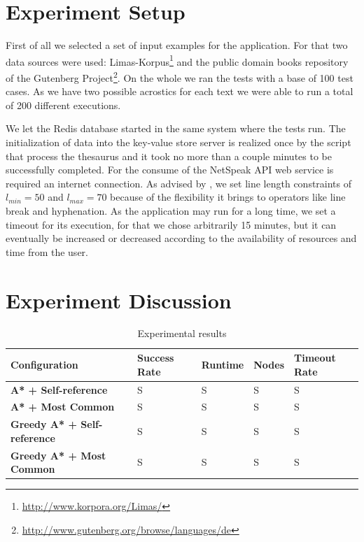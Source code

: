 \documentclass[11pt]{reportAlternative}
\begin{document}
\section{Experiment Setup}
First of all we selected a set of input examples for the application. For that two data sources were used: Limas-Korpus\footnote{\url{http://www.korpora.org/Limas/}} and the public domain books repository of the Gutenberg Project\footnote{\url{http://www.gutenberg.org/browse/languages/de}}. On the whole we ran the tests with a base of  100 test cases. As we have two possible acrostics for each text we were able to run a total of 200 different executions.

We let the Redis database started in the same system where the tests run. The initialization of data into the key-value store server is realized once by the script that process the thesaurus and it took no more than a couple minutes to be successfully completed. For the consume of the NetSpeak API web service is required an internet connection. As advised by \cite{Stein}, we set line length constraints of $l_{min} = 50$ and $l_{max} = 70$ because of the flexibility it brings to operators like line break and hyphenation. As the application may run for a long time, we set a timeout for its execution, for that we chose arbitrarily 15 minutes, but it can eventually be increased or decreased according to the availability of resources and time from the user.


\section{Experiment Discussion}

\begin{table}
\centering
\begin{tabular}{l | l | l | l | l}
	\hline
	\textbf{Configuration} & \textbf{Success Rate} & \textbf{Runtime} & \textbf{Nodes} & \textbf{Timeout Rate} \\ \hline
		\textbf{A* + Self-reference}	& S	& S	& S	& S \\ \hline
		\textbf{A* + Most Common}		& S	& S	& S	& S \\ \hline
		\textbf{Greedy A* + Self-reference}	& S & S	& S	& S \\ \hline
		\textbf{Greedy A* + Most Common}	& S & S	& S	& S \\
	\hline
\end{tabular}
\label{tab:results}
\caption{Experimental results}
\end{table}
\end{document}
